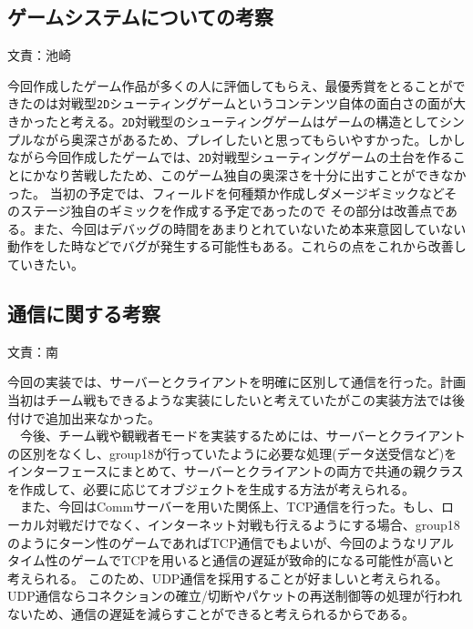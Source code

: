 \documentclass[11pt,a4j]{jarticle}
\begin{document}
\subsection{ゲームシステムについての考察}
\begin{flushright}
  文責：池崎
\end{flushright}
今回作成したゲーム作品が多くの人に評価してもらえ、最優秀賞をとることができたのは対戦型\texttt{2D}シューティングゲームというコンテンツ自体の面白さの面が大きかったと考える。\texttt{2D}対戦型のシューティングゲームはゲームの構造としてシンプルながら奥深さがあるため、プレイしたいと思ってもらいやすかった。しかしながら今回作成したゲームでは、\texttt{2D}対戦型シューティングゲームの土台を作ることにかなり苦戦したため、このゲーム独自の奥深さを十分に出すことができなかった。
当初の予定では、フィールドを何種類か作成しダメージギミックなどそのステージ独自のギミックを作成する予定であったので
その部分は改善点である。また、今回はデバッグの時間をあまりとれていないため本来意図していない動作をした時などでバグが発生する可能性もある。これらの点をこれから改善していきたい。

\subsection{通信に関する考察}
\begin{flushright}
  文責：南
\end{flushright}
今回の実装では、サーバーとクライアントを明確に区別して通信を行った。計画当初はチーム戦もできるような実装にしたいと考えていたがこの実装方法では後付けで追加出来なかった。\\
　今後、チーム戦や観戦者モードを実装するためには、サーバーとクライアントの区別をなくし、group18が行っていたように必要な処理(データ送受信など)をインターフェースにまとめて、サーバーとクライアントの両方で共通の親クラスを作成して、必要に応じてオブジェクトを生成する方法が考えられる。\\
　また、今回はCommサーバーを用いた関係上、TCP通信を行った。もし、ローカル対戦だけでなく、インターネット対戦も行えるようにする場合、group18のようにターン性のゲームであればTCP通信でもよいが、今回のようなリアルタイム性のゲームでTCPを用いると通信の遅延が致命的になる可能性が高いと考えられる。
このため、UDP通信を採用することが好ましいと考えられる。UDP通信ならコネクションの確立/切断やパケットの再送制御等の処理が行われないため、通信の遅延を減らすことができると考えられるからである。
\end{document}
